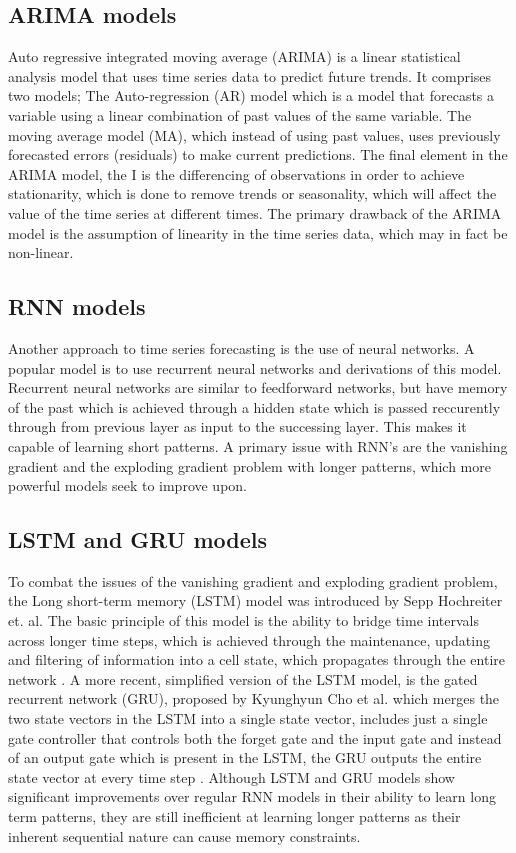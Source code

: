 \subsection{ARIMA models}
Auto regressive integrated moving average (ARIMA) is a linear statistical analysis model that uses time series data to predict future trends. It comprises two models; The Auto-regression (AR) model which is a model that forecasts a variable using a linear combination of past values of the same variable. The moving average model (MA), which instead of using past values, uses previously forecasted errors (residuals) to make current predictions. 
The final element in the ARIMA model, the I is the differencing of observations in order to achieve stationarity, which is done to remove trends or seasonality, which will affect the value of the time series at different times. The primary drawback of the ARIMA model is the assumption of linearity in the time series data, which may in fact be non-linear.\cite{HybridArimaAndNN}\cite{ForecastinPrinciplesAndPractice}

\subsection{RNN models}
Another approach to time series forecasting is the use of neural networks. A popular model is to use recurrent neural networks and derivations of this model. Recurrent neural networks are similar to feedforward networks, but have memory of the past which is achieved through a hidden state which is passed reccurently through from previous layer as input to the successing layer. This makes it capable of learning short patterns. 
A primary issue with RNN’s are the vanishing gradient and the exploding gradient problem with longer patterns, which more powerful models seek to improve upon.\cite{AIModernApproach}\cite{hands-onML}

\subsection{LSTM and GRU models}
To combat the issues of the vanishing gradient and exploding gradient problem, the Long short-term memory (LSTM) model was introduced by Sepp Hochreiter et. al. The basic principle of this model is the ability to bridge time intervals across longer time steps, which is achieved through the maintenance, updating and filtering of information into a cell state, which propagates through the entire network \cite{LSTMPaper}. 
A more recent, simplified version of the LSTM model, is the gated recurrent network (GRU), proposed by Kyunghyun Cho et al. which merges the two state vectors in the LSTM into a single state vector, includes just a single gate controller that controls both the forget gate and the input gate and instead of an output gate which is present in the LSTM, the GRU outputs the entire state vector at every time step\cite{RNNPaper} \cite{hands-onML}.
Although LSTM and GRU models show significant improvements over regular RNN models in their ability to learn long term patterns, they are still inefficient at learning longer patterns as their inherent sequential nature can cause memory constraints\cite{AttentionIsAllYouNeed}. 
